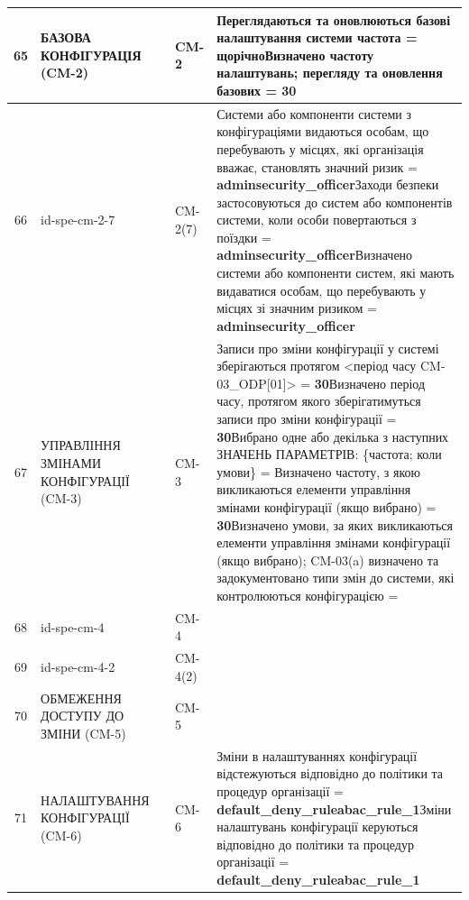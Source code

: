 \documentclass[10pt]{article}
\begin{document}
\begin{longtable}{|c|>{\raggedright\arraybackslash}p{2.5cm}|>{\raggedright\arraybackslash}p{4.5cm}|>{\raggedright\arraybackslash}p{3cm}|>{\raggedright\arraybackslash}p{4.5cm}|}
65 & БАЗОВА КОНФІГУРАЦІЯ (CM-2) &  & CM-2 & Переглядаються та оновлюються базові налаштування системи частота = \textbf{щорічно}\newline Визначено частоту налаштувань; перегляду та оновлення базових = \textbf{30} \\ \hline
66 & id-spe-cm-2-7 &  & CM-2(7) & Системи або компоненти системи з конфігураціями видаються особам, що перебувають у місцях, які організація вважає, становлять значний ризик = \textbf{adminsecurity\_\allowbreak{}officer}\newline Заходи безпеки застосовуються до систем або компонентів системи, коли особи повертаються з поїздки = \textbf{adminsecurity\_\allowbreak{}officer}\newline Визначено системи або компоненти систем, які мають видаватися особам, що перебувають у місцях зі значним ризиком = \textbf{adminsecurity\_\allowbreak{}officer} \\ \hline
67 & УПРАВЛІННЯ ЗМІНАМИ КОНФІГУРАЦІЇ (CM-3) &  & CM-3 & Записи про зміни конфігурації у системі зберігаються протягом <період часу CM-03\_\allowbreak{}ODP[01]> = \textbf{30}\newline Визначено період часу, протягом якого зберігатимуться записи про зміни конфігурації = \textbf{30}\newline Вибрано одне або декілька з наступних ЗНАЧЕНЬ ПАРАМЕТРІВ: \{частота; коли умови\} = \textbf{}\newline Визначено частоту, з якою викликаються елементи управління змінами конфігурації (якщо вибрано) = \textbf{30}\newline Визначено умови, за яких викликаються елементи управління змінами конфігурації (якщо вибрано); CM-03(a) визначено та задокументовано типи змін до системи, які контролюються конфігурацією = \textbf{} \\ \hline
68 & id-spe-cm-4 &  & CM-4 &  \\ \hline
69 & id-spe-cm-4-2 &  & CM-4(2) &  \\ \hline
70 & ОБМЕЖЕННЯ ДОСТУПУ ДО ЗМІНИ (CM-5) &  & CM-5 &  \\ \hline
71 & НАЛАШТУВАННЯ КОНФІГУРАЦІЇ (CM-6) &  & CM-6 & Зміни в налаштуваннях конфігурації відстежуються відповідно до політики та процедур організації = \textbf{default\_\allowbreak{}deny\_\allowbreak{}ruleabac\_\allowbreak{}rule\_\allowbreak{}1}\newline Зміни налаштувань конфігурації керуються відповідно до політики та процедур організації = \textbf{default\_\allowbreak{}deny\_\allowbreak{}ruleabac\_\allowbreak{}rule\_\allowbreak{}1} \\ \hline

\end{longtable}
\end{document}
